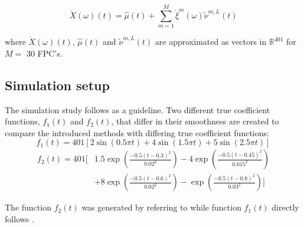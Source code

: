 \documentclass[11pt,twoside,a4paper]{article}
\begin{document}
	
	\begin{equation}
		\mathring{X}(\omega)(t) = \hat{\mu}(t) + \sum_{m = 1}^{M} \mathring{\xi}^m(\omega) \tilde{\nu}^{m,L}(t)
	\end{equation}
	
	where $\mathring{X}(\omega)(t)$, $\hat{\mu}(t)$ and $\tilde{\nu}^{m,L}(t)$  are approximated as vectors in $\mathbb{R}^{401}$ for $M =$ 30 FPC's.
    
    \subsection{Simulation setup}
	The simulation study follows \cite{Reiss_2007b} as a guideline. Two different true coefficient functions,  $f_1(t)$ and  $f_2(t)$, that differ in their smoothness are created to compare the introduced methods with differing true coefficient functions:
	\begin{equation}
    	f_1(t) = 401 \left[ 2\sin(0.5\pi t) + 4\sin(1.5 \pi t) + 5\sin(2.5 \pi t) \right]
    \end{equation}
    \begin{equation}
    	\begin{split}
    		f_2(t) = 401  \Bigg[ & 1.5 \exp{\left(\frac{-0.5(t-0.3)^2}{0.02^2}\right)} - 4 \exp{\left(\frac{-0.5(t-0.45)^2}{0.015^2}\right)} \\
    				 & + 8 \exp{\left(\frac{-0.5(t-0.6)^2}{0.02^2}\right)} -  \exp{\left(\frac{-0.5(t-0.8)^2}{0.03^2}\right)} \Bigg]
    	\end{split}
    \end{equation}
    
    The function $f_2(t)$ was generated by referring to \cite{cardot_bumpyfunction_2002} while function $f_1(t)$ directly follows \cite{Reiss_2007b}. 
\end{document}
